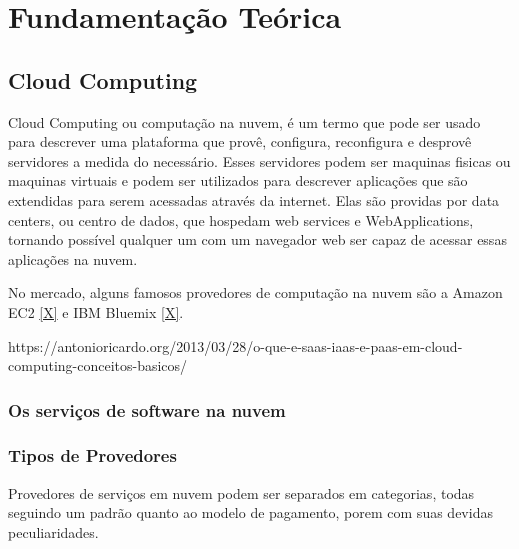 \usepackage{booktabs}

\chapter{Fundamentação Teórica}
\section{Cloud Computing}
	Cloud Computing ou computação na nuvem, é um termo que pode ser usado para descrever uma plataforma que provê, configura, reconfigura e desprovê servidores a medida do necessário. Esses servidores podem ser maquinas fisicas ou maquinas virtuais e podem  ser utilizados para descrever aplicações que são extendidas para serem acessadas através da internet. Elas são providas por data centers, ou centro de dados, que hospedam web services e WebApplications, tornando possível qualquer um com um navegador web ser capaz de acessar essas aplicações na nuvem.
	
	No mercado, alguns famosos provedores de computação na nuvem são a Amazon EC2 \ref{X} e IBM Bluemix \ref{X}.
	
	https://antonioricardo.org/2013/03/28/o-que-e-saas-iaas-e-paas-em-cloud-computing-conceitos-basicos/

	\subsection{Os serviços de software na nuvem}

	\subsection{Tipos de Provedores} 
		Provedores de serviços em nuvem podem ser separados em categorias, todas seguindo um padrão quanto ao modelo de pagamento, porem com suas devidas peculiaridades.
	
